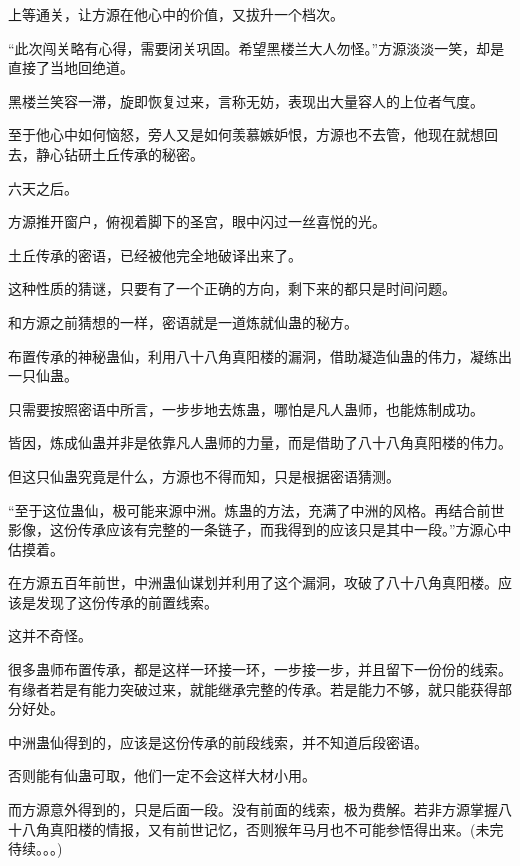 \begin{this_body}
上等通关，让方源在他心中的价值，又拔升一个档次。

“此次闯关略有心得，需要闭关巩固。希望黑楼兰大人勿怪。”方源淡淡一笑，却是直接了当地回绝道。

黑楼兰笑容一滞，旋即恢复过来，言称无妨，表现出大量容人的上位者气度。

至于他心中如何恼怒，旁人又是如何羡慕嫉妒恨，方源也不去管，他现在就想回去，静心钻研土丘传承的秘密。

六天之后。

方源推开窗户，俯视着脚下的圣宫，眼中闪过一丝喜悦的光。

土丘传承的密语，已经被他完全地破译出来了。

这种性质的猜谜，只要有了一个正确的方向，剩下来的都只是时间问题。

和方源之前猜想的一样，密语就是一道炼就仙蛊的秘方。

布置传承的神秘蛊仙，利用八十八角真阳楼的漏洞，借助凝造仙蛊的伟力，凝练出一只仙蛊。

只需要按照密语中所言，一步步地去炼蛊，哪怕是凡人蛊师，也能炼制成功。

皆因，炼成仙蛊并非是依靠凡人蛊师的力量，而是借助了八十八角真阳楼的伟力。

但这只仙蛊究竟是什么，方源也不得而知，只是根据密语猜测。

“至于这位蛊仙，极可能来源中洲。炼蛊的方法，充满了中洲的风格。再结合前世影像，这份传承应该有完整的一条链子，而我得到的应该只是其中一段。”方源心中估摸着。

在方源五百年前世，中洲蛊仙谋划并利用了这个漏洞，攻破了八十八角真阳楼。应该是发现了这份传承的前置线索。

这并不奇怪。

很多蛊师布置传承，都是这样一环接一环，一步接一步，并且留下一份份的线索。有缘者若是有能力突破过来，就能继承完整的传承。若是能力不够，就只能获得部分好处。

中洲蛊仙得到的，应该是这份传承的前段线索，并不知道后段密语。

否则能有仙蛊可取，他们一定不会这样大材小用。

而方源意外得到的，只是后面一段。没有前面的线索，极为费解。若非方源掌握八十八角真阳楼的情报，又有前世记忆，否则猴年马月也不可能参悟得出来。(未完待续。。。)

\end{this_body}

